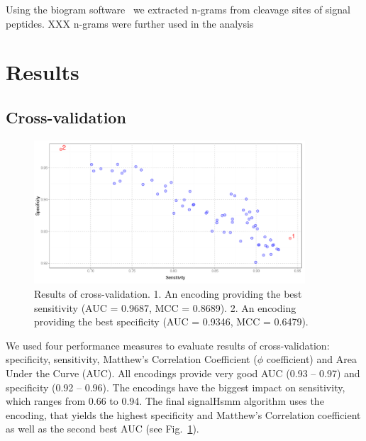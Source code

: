 \documentclass[fleqn,10pt,twoside]{gcb15submission}
\begin{document}
Using the biogram software~\citep{biogramPackage} we extracted n-grams from cleavage sites of signal peptides. 
XXX n-grams were further used in the analysis

\section*{Results}

\subsection*{Cross-validation}

\begin{figure}[ht]\centering
\includegraphics[width=0.9\textwidth]{figures/cvres.png}
\caption{Results of cross-validation. 1. An encoding providing the best sensitivity (AUC = 0.9687, MCC = 0.8689). 2. An encoding providing the best specificity (AUC = 0.9346, MCC = 0.6479).}
\label{fig:cvres}
\end{figure}

We used four performance measures to evaluate results of cross-validation: specificity, sensitivity, Matthew's Correlation Coefficient ($\phi$ coefficient) and Area Under the Curve (AUC). All encodings provide very good AUC (0.93 -- 0.97) and specificity (0.92 -- 0.96). The encodings have the biggest impact on sensitivity, which ranges from 0.66 to 0.94. The final signalHsmm algorithm uses the encoding, that yields the highest specificity and Matthew's Correlation coefficient as well as the second best AUC (see Fig.~\ref{fig:cvres}).
\end{document}
